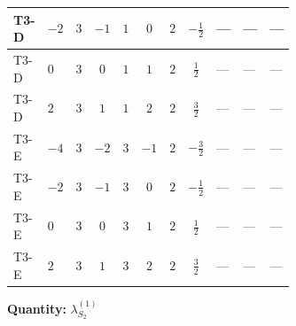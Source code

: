 \documentclass[8pt]{article}
\begin{document}
\begin{landscape}
\begin{longtable}{@{}llcccccc >{\raggedright\arraybackslash}p{0.21\linewidth} >{\raggedright\arraybackslash}p{0.21\linewidth} >{\raggedright\arraybackslash}p{0.21\linewidth}@{}}
\midrule
T3-D & $-2$ & $3$ & $-1$ & $1$ & $0$ & $2$ & $-\frac{1}{2}$ & --- & --- & --- \\
\midrule
T3-D & $0$ & $3$ & $0$ & $1$ & $1$ & $2$ & $\frac{1}{2}$ & --- & --- & --- \\
\midrule
T3-D & $2$ & $3$ & $1$ & $1$ & $2$ & $2$ & $\frac{3}{2}$ & --- & --- & --- \\
\midrule
T3-E & $-4$ & $3$ & $-2$ & $3$ & $-1$ & $2$ & $-\frac{3}{2}$ & --- & --- & --- \\
\midrule
T3-E & $-2$ & $3$ & $-1$ & $3$ & $0$ & $2$ & $-\frac{1}{2}$ & --- & --- & --- \\
\midrule
T3-E & $0$ & $3$ & $0$ & $3$ & $1$ & $2$ & $\frac{1}{2}$ & --- & --- & --- \\
\midrule
T3-E & $2$ & $3$ & $1$ & $3$ & $2$ & $2$ & $\frac{3}{2}$ & --- & --- & --- \\
\midrule
\bottomrule
\end{longtable}
\clearpage
\noindent\textbf{Quantity: }$\lambda_{S_2}^{(1)}$\par\smallskip

\end{landscape}
\end{document}
